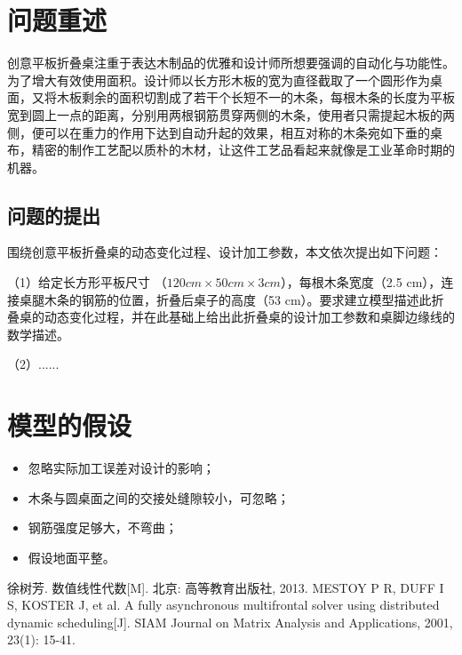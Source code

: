 \documentclass{zjgsureport}
\date{\zhtoday}
\begin{document}
\makecover  %


\thispagestyle{empty}
\tableofcontents
\newpage
\setcounter{page}{1}

\section{问题重述}

创意平板折叠桌注重于表达木制品的优雅和设计师所想要强调的自动化与功能性。为了增大有效使用面积。设计师以长方形木板的宽为直径截取了一个圆形作为桌面，又将木板剩余的面积切割成了若干个长短不一的木条，每根木条的长度为平板宽到圆上一点的距离，分别用两根钢筋贯穿两侧的木条，使用者只需提起木板的两侧，便可以在重力的作用下达到自动升起的效果，相互对称的木条宛如下垂的桌布，精密的制作工艺配以质朴的木材，让这件工艺品看起来就像是工业革命时期的机器。

\subsection{问题的提出}

围绕创意平板折叠桌的动态变化过程、设计加工参数，本文依次提出如下问题：

（1）给定长方形平板尺寸 （$120 cm \times 50 cm \times 3 cm$），每根木条宽度（2.5 cm），连接桌腿木条的钢筋的位置，折叠后桌子的高度（53 cm）。要求建立模型描述此折叠桌的动态变化过程，并在此基础上给出此折叠桌的设计加工参数和桌脚边缘线的数学描述。

（2）......

\section{模型的假设}

\begin{itemize}
    \item 忽略实际加工误差对设计的影响；
    \item 木条与圆桌面之间的交接处缝隙较小，可忽略；
    \item 钢筋强度足够大，不弯曲；
    \item 假设地面平整。
\end{itemize}


\newpage
\begin{thebibliography}{99}
    徐树芳. 数值线性代数[M]. 北京: 高等教育出版社, 2013.
    MESTOY P R, DUFF I S, KOSTER J, et al. A fully asynchronous multifrontal solver using distributed dynamic scheduling[J]. SIAM Journal on Matrix Analysis and Applications, 2001, 23(1): 15-41.
\end{thebibliography}
\end{document}
